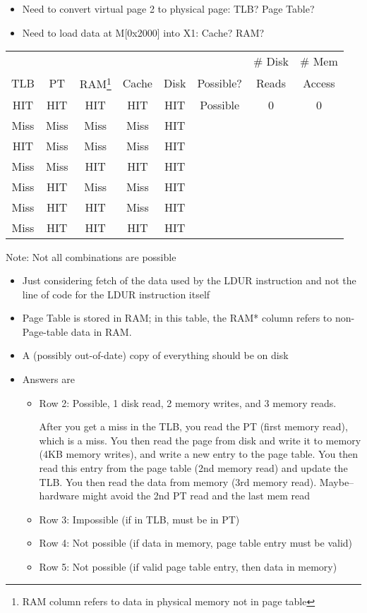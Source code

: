 \begin{frame}[fragile]
\begin{tcolorbox}
{\begin{itemize}
\item Need to convert virtual page 2 to physical page: TLB? Page Table?
\item Need to load data at M[0x2000] into X1: Cache?  RAM?
\end{itemize}
\begin{center}
\begin{tabular}{ccccc|ccc}
& & & & & & \# Disk & \# Mem\\
TLB & PT &RAM\footnote{RAM column refers to data in physical memory not in page table} & Cache & Disk & Possible? & Reads & Access\\
\hline
HIT & HIT & HIT & HIT & HIT & Possible & 0 & 0 \\
Miss & Miss & Miss & Miss & HIT & &\\
HIT & Miss & Miss & Miss & HIT & &\\
	\hline
Miss & Miss & HIT & HIT & HIT & &\\
Miss & HIT & Miss & Miss & HIT & & \\
Miss & HIT & HIT & Miss & HIT & &\\
	\hline
Miss & HIT & HIT & HIT & HIT & &\\
\end{tabular}
\end{center}
}
\end{tcolorbox}
Note: Not all combinations are possible
\BNotes\ifnum{}
\begin{itemize}
	\item Just considering fetch of the data used by the LDUR instruction
		and not the line of code for the LDUR instruction itself
	\item Page Table is stored in RAM; in this table, the RAM* column
		refers to non-Page-table data in RAM.
    \item A (possibly out-of-date) copy of everything should be on disk
	\item Answers are
	\begin{itemize}
	\item Row 2: Possible, 1 disk read, 2 memory writes, and 3 memory reads.

		 After you get a miss
		in the TLB, you read the PT (first memory read),
		which is a miss.  You then read the page from disk and
		write it to memory (4KB memory writes), 
		and write a new entry to the page table.
		You then read this entry from the page table (2nd memory
		read) and update the TLB.  You then read the data from memory
		(3rd memory read).  Maybe--hardware might avoid the 2nd PT read 
		and the last mem read
	\item Row 3: Impossible (if in TLB, must be in PT)
	\item Row 4: Not possible (if data in memory, page table entry must be valid)
    \item Row 5: Not possible (if valid page table entry, then data in memory)


\end{itemize}
\end{itemize}
\end{frame}
